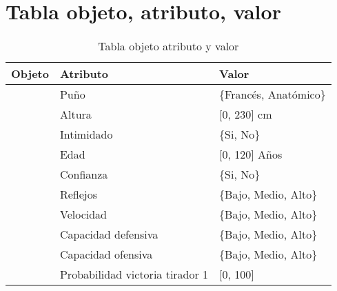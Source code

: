 \chapter{Tabla objeto, atributo, valor}
\label{cap:tabla objeto atributo valor}

\begin{longtable}{>{\bfseries}lll}
  \caption{Tabla objeto atributo y valor}
  \label{tab:Tabla objeto atributo y valor anexo}

  \endfirsthead
  \endhead

  Objeto & Atributo & Valor \\ \hline
  \multicolumn{1}{l|}{\multirow{4}{*}{Tirador}} & Puño & \{Francés, Anatómico\} \\ \cline{2-3}
  \multicolumn{1}{l|}{} & Altura & {[}0, 230{]} cm \\ \cline{2-3}
  \multicolumn{1}{l|}{} & Intimidado & \{Si, No\} \\ \cline{2-3}
  \multicolumn{1}{l|}{} & Edad & {[}0, 120{]} Años \\ \cline{2-3}

  \multicolumn{1}{l|}{} & Confianza & \{Si, No\} \\ \cline{2-3}
  \multicolumn{1}{l|}{} & Reflejos & \{Bajo, Medio, Alto\} \\ \cline{2-3}
  \multicolumn{1}{l|}{} & Velocidad & \{Bajo, Medio, Alto\} \\ \cline{2-3}
  \multicolumn{1}{l|}{} & Capacidad defensiva & \{Bajo, Medio, Alto\} \\ \cline{2-3}
  \multicolumn{1}{l|}{} & Capacidad ofensiva & \{Bajo, Medio, Alto\} \\ \cline{2-3}

  \multicolumn{1}{l|}{} & Probabilidad victoria tirador 1 & [0, 100] \\ \cline{2-3}
\end{longtable}


